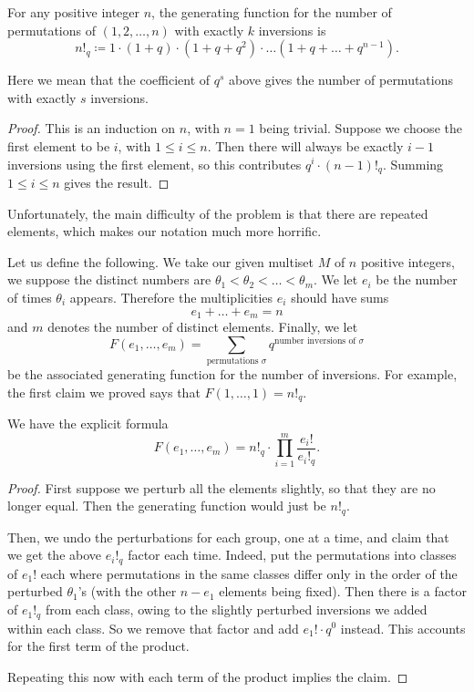 \documentclass[11pt]{scrartcl}
\begin{document}
\begin{claim*}
  For any positive integer $n$,
  the generating function for the number of permutations
  of $(1, 2, \dots, n)$ with exactly $k$ inversions is
  \[ n!_q \coloneqq 1 \cdot (1+q) \cdot (1+q+q^2) \cdot \dots (1+q+\dots+q^{n-1}). \]
\end{claim*}
Here we mean that the coefficient of $q^s$ above
gives the number of permutations with exactly $s$ inversions.
\begin{proof}
  This is an induction on $n$, with $n=1$ being trivial.
  Suppose we choose the first element to be $i$, with $1 \le i \le n$.
  Then there will always be exactly $i-1$ inversions
  using the first element,
  so this contributes $q^i \cdot (n-1)!_q$.
  Summing $1 \le i \le n$ gives the result.
\end{proof}
Unfortunately, the main difficulty of the problem
is that there are repeated elements,
which makes our notation much more horrific.

Let us define the following.
We take our given multiset $M$ of $n$ positive integers,
we suppose the distinct numbers are
$\theta_1 < \theta_2 < \dots < \theta_m$.
We let $e_i$ be the number of times $\theta_i$ appears.
Therefore the multiplicities $e_i$ should have sums
\[ e_1 + \dots + e_m = n \]
and $m$ denotes the number of distinct elements.
Finally, we let
\[ F(e_1, \dots, e_m)
  = \sum_{\text{permutations } \sigma}
  q^{\text{number inversions of } \sigma} \]
be the associated generating function for the number of inversions.
For example, the first claim we proved says that $F(1, \dots, 1) = n!_q$.

\begin{claim*}
  We have the explicit formula
  \[ F(e_1, \dots, e_m) = n!_q \cdot \prod_{i=1}^m \frac{e_i!}{e_i!_q}. \]
\end{claim*}
\begin{proof}
  First suppose we perturb all the elements slightly,
  so that they are no longer equal.
  Then the generating function would just be $n!_q$.

  Then, we undo the perturbations for each group,
  one at a time, and claim that we get the above $e_i!_q$ factor each time.
  Indeed, put the permutations into classes of $e_1!$ each
  where permutations in the same classes differ
  only in the order of the perturbed $\theta_1$'s
  (with the other $n-e_1$ elements being fixed).
  Then there is a factor of $e_1!_q$ from each class,
  owing to the slightly perturbed inversions we added within each class.
  So we remove that factor and add $e_1! \cdot q^0$ instead.
  This accounts for the first term of the product.

  Repeating this now with each term of the product implies the claim.
\end{proof}
\end{document}
